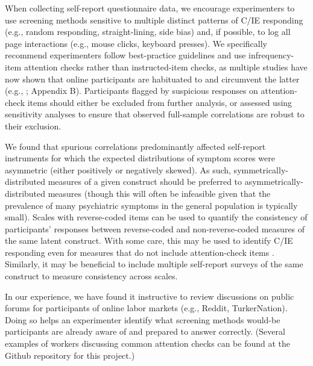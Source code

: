 \documentclass[a4paper,notitlepage,12pt]{article}
\begin{document}
When collecting self-report questionnaire data, we encourage experimenters to use screening methods sensitive to multiple distinct patterns of C/IE responding (e.g., random responding, straight-lining, side bias) and, if possible, to log all page interactions (e.g., mouse clicks, keyboard presses). We specifically recommend experimenters follow best-practice guidelines and use infrequency-item attention checks rather than instructed-item checks, as multiple studies have now shown that online participants are habituated to and circumvent the latter (e.g., \cite{barends2019noncompliant, thomas2017validity, hauser2016attentive}; Appendix B). Participants flagged by suspicious responses on attention-check items should either be excluded from further analysis, or assessed using sensitivity analyses to ensure that observed full-sample correlations are robust to their exclusion.

We found that spurious correlations predominantly affected self-report instruments for which the expected distributions of symptom scores were asymmetric (either positively or negatively skewed). As such, symmetrically-distributed measures of a given construct should be preferred to asymmetrically-distributed measures (though this will often be infeasible given that the prevalence of many psychiatric symptoms in the general population is typically small). Scales with reverse-coded items can be used to quantify the consistency of participants' responses between reverse-coded and non-reverse-coded measures of the same latent construct. With some care, this may be used to identify C/IE responding even for measures that do not include attention-check items \cite{emons2009detection}. Similarly, it may be beneficial to include multiple self-report surveys of the same construct to measure consistency across scales.
    
In our experience, we have found it instructive to review discussions on public forums for participants of online labor markets (e.g., Reddit, TurkerNation). Doing so helps an experimenter identify what screening methods would-be participants are already aware of and prepared to answer correctly. (Several examples of workers discussing common attention checks can be found at the Github repository for this project.)
\end{document}
